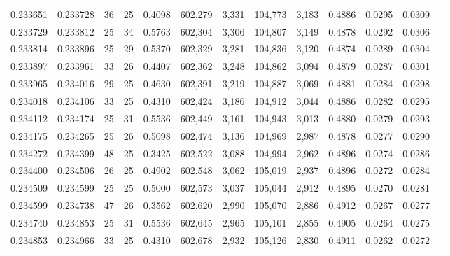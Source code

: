 \begin{tabular}{rrrrrrrrrrrrr}
0.233651 & 0.233728 &  36 &  25 &                                     0.4098 & 602,279 &   3,331 & 104,773 &   3,183 & 0.4886 & 0.0295 & 0.0309 \\
0.233729 & 0.233812 &  25 &  34 &                                     0.5763 & 602,304 &   3,306 & 104,807 &   3,149 & 0.4878 & 0.0292 & 0.0306 \\
0.233814 & 0.233896 &  25 &  29 &                                     0.5370 & 602,329 &   3,281 & 104,836 &   3,120 & 0.4874 & 0.0289 & 0.0304 \\
0.233897 & 0.233961 &  33 &  26 &                                     0.4407 & 602,362 &   3,248 & 104,862 &   3,094 & 0.4879 & 0.0287 & 0.0301 \\
0.233965 & 0.234016 &  29 &  25 &                                     0.4630 & 602,391 &   3,219 & 104,887 &   3,069 & 0.4881 & 0.0284 & 0.0298 \\
0.234018 & 0.234106 &  33 &  25 &                                     0.4310 & 602,424 &   3,186 & 104,912 &   3,044 & 0.4886 & 0.0282 & 0.0295 \\
0.234112 & 0.234174 &  25 &  31 &                                     0.5536 & 602,449 &   3,161 & 104,943 &   3,013 & 0.4880 & 0.0279 & 0.0293 \\
0.234175 & 0.234265 &  25 &  26 &                                     0.5098 & 602,474 &   3,136 & 104,969 &   2,987 & 0.4878 & 0.0277 & 0.0290 \\
0.234272 & 0.234399 &  48 &  25 &                                     0.3425 & 602,522 &   3,088 & 104,994 &   2,962 & 0.4896 & 0.0274 & 0.0286 \\
0.234400 & 0.234506 &  26 &  25 &                                     0.4902 & 602,548 &   3,062 & 105,019 &   2,937 & 0.4896 & 0.0272 & 0.0284 \\
0.234509 & 0.234599 &  25 &  25 &                                     0.5000 & 602,573 &   3,037 & 105,044 &   2,912 & 0.4895 & 0.0270 & 0.0281 \\
0.234599 & 0.234738 &  47 &  26 &                                     0.3562 & 602,620 &   2,990 & 105,070 &   2,886 & 0.4912 & 0.0267 & 0.0277 \\
0.234740 & 0.234853 &  25 &  31 &                                     0.5536 & 602,645 &   2,965 & 105,101 &   2,855 & 0.4905 & 0.0264 & 0.0275 \\
0.234853 & 0.234966 &  33 &  25 &                                     0.4310 & 602,678 &   2,932 & 105,126 &   2,830 & 0.4911 & 0.0262 & 0.0272 \\

\end{tabular}
